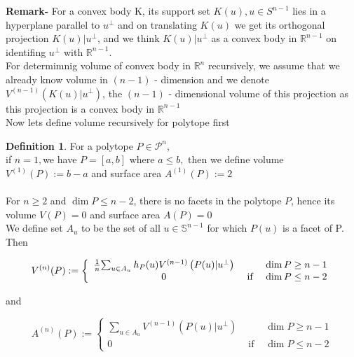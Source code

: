 \documentclass[oneside]{book}
\theoremstyle{definition}
\newtheorem{mydef}{Definition}[chapter]
\begin{document}
\textbf{Remark-} 
For a convex body  K, its support set $K(u),u \in S^{n-1} $ lies in a hyperplane parallel to 
$u^{\perp}$ and on translating $K(u)$ we get its orthogonal projection $K(u) | u^{\perp}$, and we think  $K(u) | u^{\perp}$ as a convex body in $\mathbb{R}^{n-1}$  on identifing $u^{\perp}$ with $\mathbb{R}^{n-1}$. \\
  For determimnig volume of convex body in $\mathbb{R}^{n}$ recursively, we assume that we already  know volume in $(n-1)$ - dimension and we denote $V^{(n-1)}\left(K(u) | u^{\perp}\right)$, the $(n-1)$ - dimensional volume of this projection as this projection is a convex body in $\mathbb{R}^{n-1}$ 
\\
Now lets define volume recursively for polytope first 

  \begin{mydef}


For a polytope $P \in \mathcal{P}^{n}$,\\

if  $n=1,$we have  $P=[a, b]$ where $a \leq b,$ then we define volume $V^{(1)}(P):=b-a$ and  surface area $A^{(1)}(P):=2$ 
\\\\
  For  $ n \geq 2  $ and $\operatorname{dim} P \leq n-2$, there is no facets in the polytope $P$, hence its volume $V(P)=0$ and surface area $A(P)=0$ \\
  
 We define set $A_{{u}}$ to be the set of all $u \in \mathbb{S}^{n-1}$ for which $P(u)$ is a facet of P. Then 

\begin{equation}
\label{eq43}
V^{(n)}(P):=\left\{\begin{array}{ccc}
\frac{1}{n} $$ \sum_{u \in A_{u}} h_{P}(u) V^{(n-1)}\left(P(u) | u^{\perp}\right) & & \operatorname{dim} P \geq n-1 \\
0 & \text { if } & \operatorname{dim} P \leq n-2
\end{array}\right.
\end{equation}



and

\begin{equation}
\label{eq44}
A^{(n)}(P):=\left\{\begin{array}{ccc}
\sum_{u \in A_{u}} V^{(n-1)}\left(P(u) | u^{\perp}\right) & & \operatorname{dim} P \geq n-1 \\
0 & \text { if } & \operatorname{dim} P \leq n-2
\end{array}\right.
\end{equation}



\end{mydef}
\end{document}
